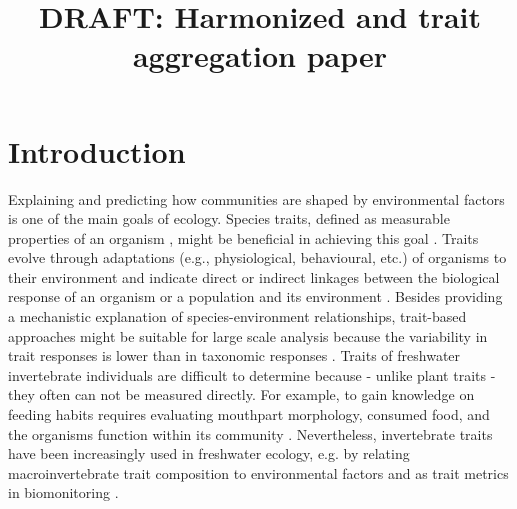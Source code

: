\documentclass{article}
\title{DRAFT: Harmonized and trait aggregation paper }
\author{}%
\date{}
\begin{document}
\maketitle

\section*{Introduction}

Explaining and predicting how communities are shaped by environmental factors is one of the main goals of ecology. Species traits, defined as measurable properties of an organism \cite{mcgill_rebuilding_2006}, might be beneficial in achieving this goal \cite{heino_jani_macroecological_2013}. Traits evolve through adaptations (e.g., physiological, behavioural, etc.) of organisms to their environment and indicate direct or indirect linkages between the biological response of an organism or a population and its environment \cite{southwood_habitat_1977, verberk_delivering_2013}.
Besides providing a mechanistic explanation of species-environment relationships, trait-based approaches might be suitable for large scale analysis because the variability in trait responses is lower than in taxonomic responses \cite{bonada_taxonomic_2007, baird_toward_2011}. Traits of freshwater invertebrate individuals are difficult to determine because - unlike plant traits - they often can not be measured directly. For example, to gain knowledge on feeding habits requires evaluating mouthpart morphology, consumed food, and the organisms function within its community \cite{moog_comprehensive_nodate}. Nevertheless, invertebrate traits have been increasingly used in freshwater ecology, e.g. by relating macroinvertebrate trait composition to environmental factors and as trait metrics in biomonitoring \cite{poff_developing_2010, szocs_effects_2014, bhowmik_large_2015, menezes_beyond_2010}.
\end{document}
